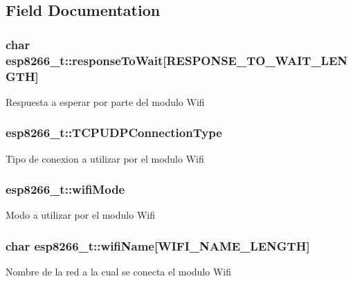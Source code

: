\subsection{Field Documentation}
\subsubsection[{\texorpdfstring{response\+To\+Wait}{responseToWait}}]{\setlength{\rightskip}{0pt plus 5cm}char esp8266\+\_\+t\+::response\+To\+Wait\mbox{[}{\bf R\+E\+S\+P\+O\+N\+S\+E\+\_\+\+T\+O\+\_\+\+W\+A\+I\+T\+\_\+\+L\+E\+N\+G\+TH}\mbox{]}}\hypertarget{structesp8266__t_a8c564dbf94d8d2f758fdc92d5c4dc4e6}{}\label{structesp8266__t_a8c564dbf94d8d2f758fdc92d5c4dc4e6}
Respuesta a esperar por parte del modulo Wifi 
\subsubsection[{\texorpdfstring{T\+C\+P\+U\+D\+P\+Connection\+Type}{TCPUDPConnectionType}}]{ esp8266\+\_\+t\+::\+T\+C\+P\+U\+D\+P\+Connection\+Type}\hypertarget{structesp8266__t_a673d2888e6c5818cfbb2f1688cde2333}{}\label{structesp8266__t_a673d2888e6c5818cfbb2f1688cde2333}
Tipo de conexion a utilizar por el modulo Wifi 
\subsubsection[{\texorpdfstring{wifi\+Mode}{wifiMode}}]{ esp8266\+\_\+t\+::wifi\+Mode}\hypertarget{structesp8266__t_adf5f5479a30aad5ab054133aa68f5184}{}\label{structesp8266__t_adf5f5479a30aad5ab054133aa68f5184}
Modo a utilizar por el modulo Wifi 
\subsubsection[{\texorpdfstring{wifi\+Name}{wifiName}}]{\setlength{\rightskip}{0pt plus 5cm}char esp8266\+\_\+t\+::wifi\+Name\mbox{[}{\bf W\+I\+F\+I\+\_\+\+N\+A\+M\+E\+\_\+\+L\+E\+N\+G\+TH}\mbox{]}}\hypertarget{structesp8266__t_a1a70381e7e2b5613e995bdca52d381f1}{}\label{structesp8266__t_a1a70381e7e2b5613e995bdca52d381f1}
Nombre de la red a la cual se conecta el modulo Wifi 
